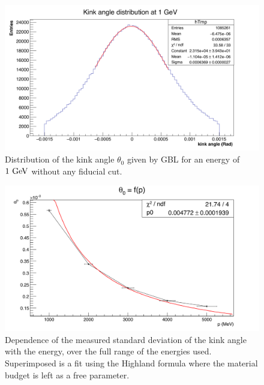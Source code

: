    \begin{figure}[!p]
     \centering
     \includegraphics[width = \textwidth]{Pictures/X0/kinkAngle1GeV.png}
     \caption{Distribution of the kink angle $\theta_{0}$ given by GBL for an energy of $1~\rm{GeV}$ without any fiducial cut.}
     \label{fig:kinkAngle1GeV}
   \end{figure} 
   
   \begin{figure}[!tbh]
     \centering
     \includegraphics[width = \textwidth]{Pictures/X0/theta0VsP_all.png}
     \caption{Dependence of the measured standard deviation of the kink angle with the energy, over the full range of the energies used. Superimposed is a fit using the Highland formula where the material budget is left as a free parameter.}
     \label{fig:theta0vsP_all}
   \end{figure}
  

